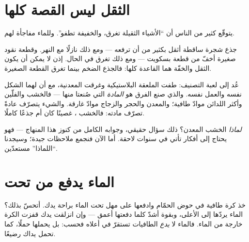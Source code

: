 \section{الثقل ليس القصة كلها}

يتوقّع كثير من الناس أن ``الأشياء الثقيلة تغرق، والخفيفة تطفو''.
وللماء مفاجأة لهم.

\begin{example}\label{ex:g1:floating-and-sinking:log}
جذع شجرة ساقطة أثقل بكثير من أن ترفعه --- ومع ذلك  نازلًا مع
النهر. وقطعة نقود صغيرة أخفّ من قطعة بسكويت --- ومع ذلك تغرق في
الحال. إذن لا يمكن أن يكون الثقل والخفّة هما القاعدة كلها: فالجذع
الضخم  بينما تغرق القطعة الصغيرة.
\end{example}

\begin{example}\label{ex:g1:floating-and-sinking:stuff}
عُد إلى لعبة التصنيف: طفت الملعقة البلاستيكية وغرقت المعدنية، مع
أن لهما الشكل نفسه والعمل نفسه. والذي صنع الفرق هو \emph{المادة}
التي صُنعتا منها --- فالخشب والفلّين وأكثر اللدائن موادّ طافية؛
والمعدن والحجر والزجاج موادّ غارقة. والشيء يتصرّف عادةً تصرّف
مادته: فالخشب ، غصينًا كان أم جذعًا كاملًا.
\end{example}

\begin{remark}\label{rem:g1:floating-and-sinking:why}
\emph{لماذا}  الخشب  المعدن؟ ذلك سؤال حقيقي، وجوابه
الكامل من كنوز هذا المنهاج --- فهو يحتاج إلى أفكار تأتي في سنوات
لاحقة. أما الآن فنجمع ملاحظات جيدة؛ وسيجدنا ``اللماذا'' مستعدّين.
\end{remark}

\section{الماء يدفع من تحت}

\begin{example}\label{ex:g1:floating-and-sinking:push}
خذ كرة طافية في حوض الحمّام وادفعها على مهل تحت الماء براحة يدك.
أتحسّ بذلك؟ الماء يردّها إلى الأعلى، وبقوة أشدّ كلما دفعتها أعمق
--- وإن انزلقت يدك قفزت الكرة خارجة من الماء. فالماء لا
\emph{يدع} الطافيات تستقرّ في أعلاه فحسب: بل يحملها حملًا، كما
تحمل يداك رضيعًا.
\end{example}

